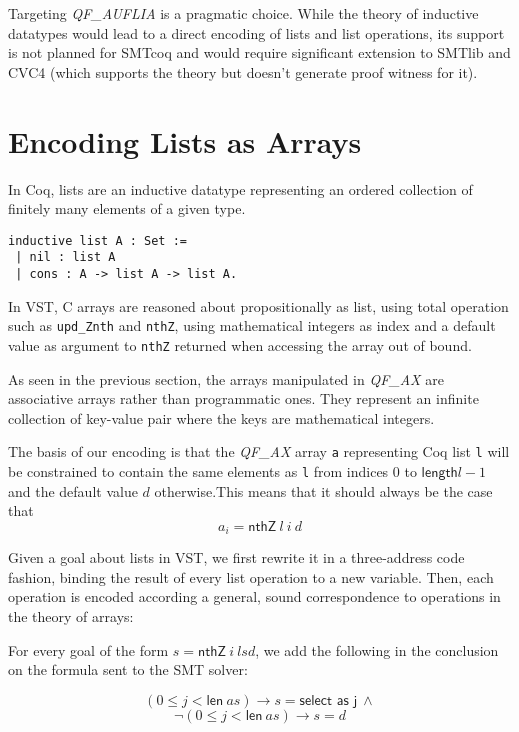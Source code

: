 \documentclass[preprint]{sigplanconf}
\begin{document}
Targeting \emph{QF\_AUFLIA} is a pragmatic choice. While the theory of inductive datatypes would lead to a direct encoding of lists and list operations, its support is not planned for SMTcoq and would require significant extension to SMTlib and CVC4 (which supports the theory but doesn't generate proof witness for it). 


\section{Encoding Lists as Arrays}

In Coq, lists are an inductive datatype representing an ordered collection of finitely many elements of a given type. 
\begin{lstlisting}
inductive list A : Set :=
 | nil : list A
 | cons : A -> list A -> list A.
\end{lstlisting}

In VST, C arrays are reasoned about propositionally as list, using total operation such as \lstinline|upd_Znth| and \lstinline|nthZ|, using mathematical integers as index and a default value as argument to \lstinline|nthZ| returned when accessing the array out of bound. 

As seen in the previous section, the arrays manipulated in \emph{QF\_AX} are associative arrays rather than programmatic ones. They represent an infinite collection of key-value pair where the keys are mathematical integers. 

The basis of our encoding is that the \emph{QF\_AX} array \lstinline|a| representing Coq list \lstinline|l| will be constrained to contain the same elements as \lstinline|l| from indices $0$ to $\mathsf{length} l - 1$ and the default value $d$ otherwise.This means that it should always be the case that
$$ a_i = \textsf{nthZ}\ l\ i\ d$$

Given a goal about lists in VST, we first rewrite it in a three-address code fashion, binding the result of every list operation to a new variable. Then, each operation is encoded according a general, sound correspondence to operations in the theory of arrays:

For every goal of the form $s = \textsf{nthZ}\ i\ ls d$, we add the following in the conclusion on the formula sent to the SMT solver:

$$ (0 \leq j < \textsf{len}\ as) \to s = \textsf{select as j}\ \wedge$$
$$\neg (0 \leq j < \textsf{len}\ as) \to s = d $$
\end{document}

